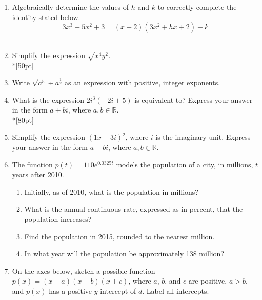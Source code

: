 \documentclass[12pt, oneside]{article}
\begin{document}
\begin{enumerate}
\item Algebraically determine the values of $h$ and $k$ to correctly complete the identity stated below.
\[3x^3-5x^2+3=(x-2)(3x^2+hx+2)+k\] \\[2in] %


\item Simplify the expression $\sqrt{x^4 y^2}$.\\*[50pt]

\item Write $\sqrt{a^5} \div a^{\frac{1}{2}}$ as an expression with positive, integer exponents.%

\newpage

\item What is the expression $2i^3(-2i+5)$ is equivalent to? Express your answer in the form $a+bi$, where $a, b \in \mathbb{R}$.\\*[80pt]  %

\item Simplify the expression $(1x - 3i)^2$, where $i$ is the imaginary unit. Express your answer in the form $a+bi$, where $a, b \in \mathbb{R}$.\\[80pt] %

\item The function $p(t)=110e^{0.0325t}$ models the population of a city, in millions, $t$ years after 2010.
\begin{enumerate}
    \item Initially, as of 2010, what is the population in millions?\\[40pt]
    \item What is the annual continuous rate, expressed as in percent, that the population increases?\\[40pt]
    \item Find the population in 2015, rounded to the nearest million.\\[80pt]
    \item In what year will the population be approximately 138 million?
\end{enumerate}

\newpage

\item On the axes below, sketch a possible function $p(x) = (x  -a)(x - b)(x + c)$, where $a$, $b$, and $c$ are positive, $a  >b$, and $p(x)$ has a positive $y$-intercept of $d$. Label all intercepts. 
\begin{center}
\end{center} %


\end{enumerate}
\end{document}
